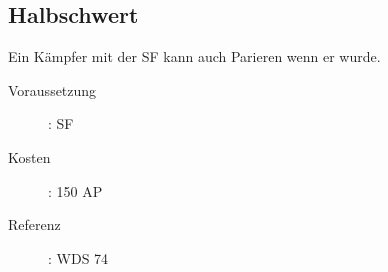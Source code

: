 \subsection{Halbschwert}
\label{sf.halbschwert}
Ein Kämpfer mit der SF  kann auch Parieren wenn er  wurde.
\begin{description}
    \item[Voraussetzung]:
        SF 
    \item [Kosten]:
        150 AP
    \item [Referenz]:
        WDS 74
\end{description}

